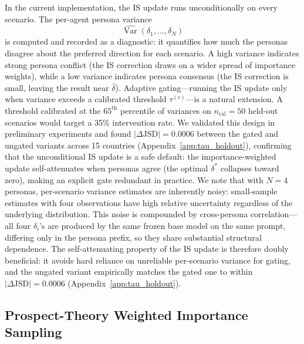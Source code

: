 \documentclass{article}
\begin{document}
In the current implementation, the IS update runs unconditionally on every scenario.
The per-agent persona variance
\begin{equation}
  \widehat{\operatorname{Var}}(\delta_1, \ldots, \delta_N)
  \label{eq:tau}
\end{equation}
is computed and recorded as a diagnostic: it quantifies how much the personas
disagree about the preferred direction for each scenario. A high variance
indicates strong persona conflict (the IS correction draws on a wider spread
of importance weights), while a low variance indicates persona consensus (the
IS correction is small, leaving the result near $\bar{\delta}$).
Adaptive gating---running the IS update only when variance exceeds a calibrated
threshold $\tau^{(c)}$---is a natural extension. A threshold calibrated at the
$65^{\text{th}}$ percentile of variances on $n_{\text{cal}}=50$ held-out
scenarios would target a 35\% intervention rate. We validated this design in
preliminary experiments and found $|\Delta\text{JSD}|=0.0006$ between the
gated and ungated variants across 15 countries (Appendix~\ref{app:tau_holdout}),
confirming that the unconditional IS update is a safe default: the importance-weighted
update self-attenuates when personas agree (the optimal $\delta^*$ collapses
toward zero), making an explicit gate redundant in practice.
We note that with $N=4$ personas, per-scenario variance estimates are inherently
noisy: small-sample estimates with four observations have high relative uncertainty
regardless of the underlying distribution. This noise is compounded by
cross-persona correlation---all four $\delta_i$'s are produced by the same frozen
base model on the same prompt, differing only in the persona prefix, so they share
substantial structural dependence. The self-attenuating property of the IS update
is therefore doubly beneficial: it avoids hard reliance on unreliable per-scenario
variance for gating, and the ungated variant empirically matches the gated one to
within $|\Delta\text{JSD}|=0.0006$ (Appendix~\ref{app:tau_holdout}).

\subsection{Prospect-Theory Weighted Importance Sampling}
\label{sec:method:ptis}
\end{document}
